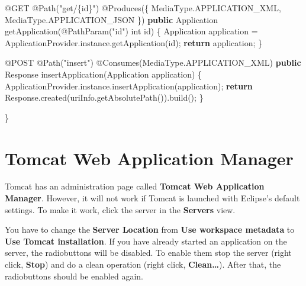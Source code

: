 \documentclass[]{report}
\newenvironment{Shaded}{}{}
\newcommand{\KeywordTok}[1]{\textcolor[rgb]{0.00,0.44,0.13}{\textbf{{#1}}}}
\newcommand{\DataTypeTok}[1]{\textcolor[rgb]{0.56,0.13,0.00}{{#1}}}
\newcommand{\StringTok}[1]{\textcolor[rgb]{0.25,0.44,0.63}{{#1}}}
\newcommand{\FunctionTok}[1]{\textcolor[rgb]{0.02,0.16,0.49}{{#1}}}
\newcommand{\NormalTok}[1]{{#1}}
\begin{document}
\begin{enumerate}
\begin{Shaded}
\begin{Highlighting}[]
  \FunctionTok{@GET}
  \FunctionTok{@Path}\NormalTok{(}\StringTok{"get/\{id\}"}\NormalTok{)}
  \FunctionTok{@Produces}\NormalTok{(\{ MediaType.}\FunctionTok{APPLICATION_XML}\NormalTok{, MediaType.}\FunctionTok{APPLICATION_JSON} \NormalTok{\})}
  \KeywordTok{public} \NormalTok{Application }\FunctionTok{getApplication}\NormalTok{(}\FunctionTok{@PathParam}\NormalTok{(}\StringTok{"id"}\NormalTok{) }\DataTypeTok{int} \NormalTok{id) \{}
    \NormalTok{Application application = ApplicationProvider.}\FunctionTok{instance}\NormalTok{.}\FunctionTok{getApplication}\NormalTok{(id);}
    \KeywordTok{return} \NormalTok{application;}
  \NormalTok{\}}

  \FunctionTok{@POST}
  \FunctionTok{@Path}\NormalTok{(}\StringTok{"insert"}\NormalTok{)}
  \FunctionTok{@Consumes}\NormalTok{(MediaType.}\FunctionTok{APPLICATION_XML}\NormalTok{)}
  \KeywordTok{public} \NormalTok{Response }\FunctionTok{insertApplication}\NormalTok{(Application application) \{}
    \NormalTok{ApplicationProvider.}\FunctionTok{instance}\NormalTok{.}\FunctionTok{insertApplication}\NormalTok{(application);}
    \KeywordTok{return} \NormalTok{Response.}\FunctionTok{created}\NormalTok{(uriInfo.}\FunctionTok{getAbsolutePath}\NormalTok{()).}\FunctionTok{build}\NormalTok{();}
  \NormalTok{\}}

\NormalTok{\}}
\end{Highlighting}
\end{Shaded}
\end{enumerate}

\section{Tomcat Web Application Manager}

Tomcat has an administration page called \textbf{Tomcat Web Application
Manager}. However, it will not work if Tomcat is launched with Eclipse's
default settings. To make it work, click the server in the
\textbf{Servers} view.

You have to change the \textbf{Server Location} from \textbf{Use
workspace metadata} to \textbf{Use Tomcat installation}. If you have
already started an application on the server, the radiobuttons will be
disabled. To enable them stop the server (right click, \textbf{Stop})
and do a clean operation (right click, \textbf{Clean\ldots{}}). After
that, the radiobuttons should be enabled again.
\end{document}
